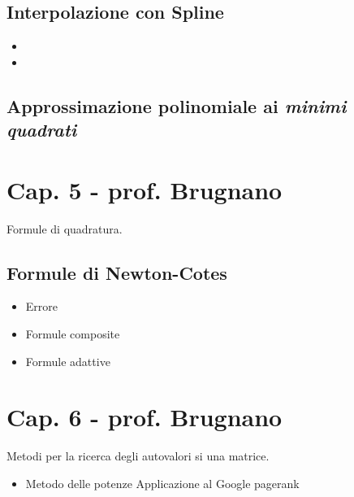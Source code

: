 \documentclass[a4paper, 12pt]{article}
\begin{document}
\subsection{Interpolazione con Spline}

	\begin{itemize}
		\item \color{green}{Spline cubica naturale} \color{black}
		\item \color{green}{Spline cubica not-a-know} \color{black}
	\end{itemize}

\subsection{Approssimazione polinomiale ai \textit{minimi quadrati}}

\vspace{0.5cm}

\section{Cap. 5 - prof. Brugnano}

Formule di quadratura.

\subsection{Formule di Newton-Cotes}

	\begin{itemize}
		\item Errore
		\item Formule composite
		\subitem \color{green}{Formula dei Trapezi} \color{black}
		\subitem \color{green}{Formula di Simpson} \color{black}
		\item Formule adattive
	\end{itemize}

\vspace{0.5cm}

\section{Cap. 6 - prof. Brugnano}

Metodi per la ricerca degli autovalori si una matrice.

	\begin{itemize}
		\item Metodo delle potenze
		\subitem Applicazione al Google pagerank
	\end{itemize}
\end{document}
